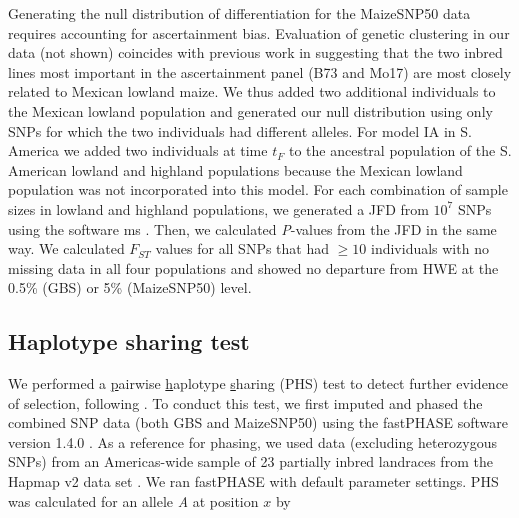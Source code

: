 Generating the null distribution of differentiation for the MaizeSNP50 data requires accounting for ascertainment bias. 
Evaluation of genetic clustering in our data (not shown) coincides with previous work \cite[]{Hufford_2012_22660546} in suggesting that the two inbred lines most important in the ascertainment panel (B73 and Mo17) are most closely related to Mexican lowland maize.  
We thus added two additional individuals to the Mexican lowland population and generated our null distribution using only SNPs for which the two individuals had different alleles.
For model IA in S. America we added two individuals at time $t_F$ to the ancestral population of the S. American lowland and highland populations because the Mexican lowland population was not incorporated into this model. 
For each combination of sample sizes in lowland and highland populations, we generated a JFD from $10^7$  SNPs using the software {\sf ms} \cite[]{Hudson_2002_11847089}.
Then, we calculated \emph{P}-values from the JFD in the same way.
We calculated $F_{ST}$ values for all SNPs that had $\geq10$ individuals with no missing data in all four populations and showed no departure from HWE at the 0.5\% (GBS) or 5\% (MaizeSNP50) level. 



\subsection*{Haplotype sharing test}
We performed a \underline{p}airwise \underline{h}aplotype \underline{s}haring (PHS) test to detect further evidence of selection, following \cite{Toomajian_2006_16623598}.  
To conduct this test, we first imputed and phased the combined SNP data (both GBS and MaizeSNP50) using the {\sf fastPHASE} software version 1.4.0 \cite[]{Scheet_2006_16532393}.  
As a reference for phasing, we used data (excluding heterozygous SNPs) from an Americas-wide sample of 23 partially inbred landraces from the Hapmap v2 data set  \cite[]{Chia_2012_22660545}.  
We ran {\sf fastPHASE}  with default parameter settings.  
PHS was calculated for an allele \emph{A} at position $x$ by

